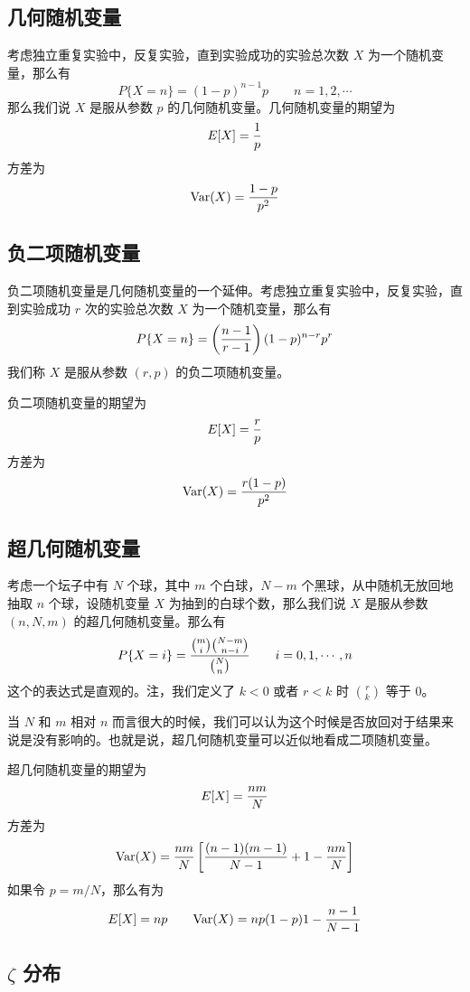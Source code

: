 \documentclass[utf8,a4paper,nofonts,9pt]{ctexbook}
\begin{document}
\subsection{几何随机变量}

考虑独立重复实验中，反复实验，直到实验成功的实验总次数 $X$ 为一个随机变量，那么有
\[
    P\{ X = n\} = (1 - p)^{n - 1} p \qquad n = 1, 2, \cdots
\]
那么我们说 $X$ 是服从参数 $p$ 的几何随机变量。几何随机变量的期望为
\[
    E[X] = {1 \over p}
\]
方差为
\[
    \textrm{Var}(X) = {1 - p \over p^2}
\]


\subsection{负二项随机变量}

负二项随机变量是几何随机变量的一个延伸。考虑独立重复实验中，反复实验，直到实验成功 $r$ 次的实验总次数 $X$ 为一个随机变量，那么有
\[
    P\{ X = n \} = \left( { n - 1 \over r - 1 } \right) (1 - p)^{n - r} p^r
\]
我们称 $X$ 是服从参数 $(r, p)$ 的负二项随机变量。

负二项随机变量的期望为
\[
    E[X] = {r \over p}
\]
方差为
\[
    \textrm{Var}(X) = {r(1 - p) \over p^2}
\]


\subsection{超几何随机变量}

考虑一个坛子中有 $N$ 个球，其中 $m$ 个白球，$N - m$ 个黑球，从中随机无放回地抽取 $n$ 个球，设随机变量 $X$ 为抽到的白球个数，那么我们说 $X$ 是服从参数 $(n, N, m)$ 的超几何随机变量。那么有
\[
    P\{ X = i \} = {{m \choose i} {N - m \choose n - i} \over {N \choose n}} \qquad i = 0, 1, \cdots, n
\]
这个的表达式是直观的。注，我们定义了 $k < 0$ 或者 $r < k$ 时 $r \choose k$ 等于 $0$。

当 $N$ 和 $m$ 相对 $n$ 而言很大的时候，我们可以认为这个时候是否放回对于结果来说是没有影响的。也就是说，超几何随机变量可以近似地看成二项随机变量。

超几何随机变量的期望为
\[
    E[X] = {nm \over N}
\]
方差为
\[
    \textrm{Var}(X) = {nm \over N}\left[ {(n - 1)(m - 1) \over N - 1} + 1 - {nm \over N} \right]
\]
如果令 $p = m / N$，那么有为
\[
    E[X] = np \qquad \textrm{Var}(X) = np(1 - p){1- {n - 1 \over N - 1}}
\]


\subsection[zeta 分布]{$\zeta$ 分布}
\end{document}
